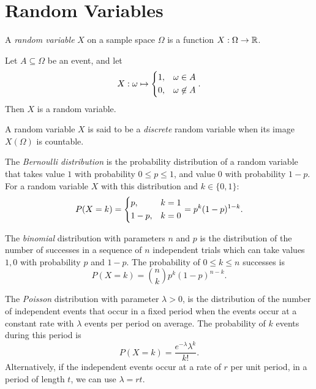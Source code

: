 \section{Random Variables}

\begin{defn}
    A \emph{random variable} $X$ on a sample space $\Omega$ is a function $X: \Omega \to \mathbb{R}$.
\end{defn}

\begin{exmp}
    Let $A \subseteq \Omega$ be an event, and let
    \[X: \omega \mapsto \begin{dcases}
        1, & \omega \in A \\
        0, & \omega \not\in A
    \end{dcases}.\]
    Then $X$ is a random variable.
\end{exmp}

\begin{defn}
    A random variable $X$ is said to be a \emph{discrete} random variable when its image $X(\Omega)$ is countable.
\end{defn}

\begin{defn}
    The \emph{Bernoulli distribution} is the probability distribution of a random variable that takes value $1$ with probability $0 \leq p \leq 1$, and value $0$ with probability $1 - p$. For a random variable $X$ with this distribution and $k \in \{0, 1\}$:
    \[P(X = k) = \begin{dcases}
        p, & k = 1  \\
        1 - p, & k = 0
    \end{dcases} = p^k(1-p)^{1-k}.\]
\end{defn}

\begin{defn}
    The \emph{binomial} distribution with parameters $n$ and $p$ is the distribution of the number of successes in a sequence of $n$ independent trials which can take values $1, 0$ with probability $p$ and $1 - p$. The probability of $ 0 \leq k \leq n$ successes is
    \[P(X = k) = \binom{n}{k}p^k(1 - p)^{n-k}.\]
\end{defn}

\begin{defn}
    The \emph{Poisson} distribution with parameter $\lambda > 0$, is the distribution of the number of independent events that occur in a fixed period when the events occur at a constant rate with $\lambda$ events per period on average. The probability of $k$ events during this period is
    \[P(X = k) = \frac{e^{-\lambda}\lambda^k}{k!}.\]
    Alternatively, if the independent events occur at a rate of $r$ per unit period, in a period of length $t$, we can use $\lambda = rt$.
\end{defn}

